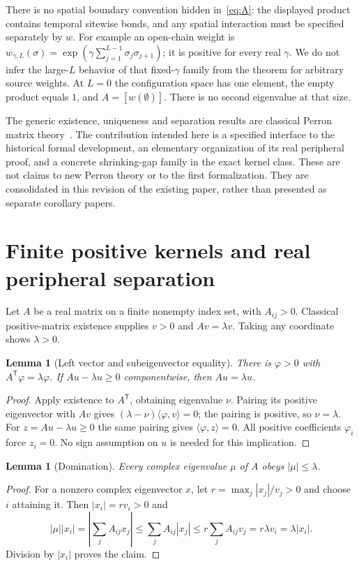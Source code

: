 \documentclass[11pt]{article}
\newtheorem{lemma}[theorem]{Lemma}
\begin{document}
There is no spatial boundary convention hidden in~\eqref{eq:A}: the displayed
product contains temporal sitewise bonds, and any spatial interaction must be
specified separately by $w$. For example an open-chain weight is
$w_{\gamma,L}(\sigma)=\exp(\gamma\sum_{j=1}^{L-1}\sigma_j\sigma_{j+1})$;
it is positive for every real $\gamma$. We do not infer the large-$L$ behavior
of that fixed-$\gamma$ family from the theorem for arbitrary source weights.
At $L=0$ the configuration space has one element, the empty product equals $1$,
and $A=[w(\emptyset)]$. There is no second eigenvalue at that size.

The generic existence, uniqueness and separation results are classical Perron
matrix theory~\cite{Perron,Ahmadinejad}. The contribution intended here is a
specified interface to the historical formal development, an elementary
organization of its real peripheral proof, and a concrete shrinking-gap family
in the exact kernel class. These are not claims to new Perron theory or to the
first formalization. They are consolidated in this revision of the existing
paper, rather than presented as separate corollary papers.

\section{Finite positive kernels and real peripheral separation}
Let $A$ be a real matrix on a finite nonempty index set, with $A_{ij}>0$.
Classical positive-matrix existence supplies $v>0$ and $Av=\lambda v$.
Taking any coordinate shows $\lambda>0$.

\begin{lemma}[Left vector and subeigenvector equality]\label{lem:left}
There is $\varphi>0$ with $A^{\mathsf T}\varphi=\lambda\varphi$.
If $Au-\lambda u\ge0$ componentwise, then $Au=\lambda u$.
\end{lemma}
\begin{proof}
Apply existence to $A^{\mathsf T}$, obtaining eigenvalue $\nu$.
Pairing its positive eigenvector with $Av$ gives
$(\lambda-\nu)\langle\varphi,v\rangle=0$; the pairing is positive, so
$\nu=\lambda$. For $z=Au-\lambda u\ge0$ the same pairing gives
$\langle\varphi,z\rangle=0$. All positive coefficients $\varphi_i$ force
$z_i=0$. No sign assumption on $u$ is needed for this implication.
\end{proof}

\begin{lemma}[Domination]\label{lem:dom}
Every complex eigenvalue $\mu$ of $A$ obeys $|\mu|\le\lambda$.
\end{lemma}
\begin{proof}
For a nonzero complex eigenvector $x$, let $r=\max_j|x_j|/v_j>0$ and choose
$i$ attaining it. Then $|x_i|=rv_i>0$ and
\[
 |\mu||x_i|=\left|\sum_jA_{ij}x_j\right|
 \le\sum_jA_{ij}|x_j|\le r\sum_jA_{ij}v_j
 =r\lambda v_i=\lambda|x_i|.
\]
Division by $|x_i|$ proves the claim.
\end{proof}
\end{document}
